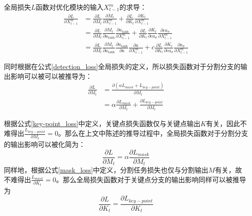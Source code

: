 \begin{corollary}
\label{corollary:loss2xm}
全局损失$L$函数对优化模块的输入$X^m_{t-1}$的求导：
\begin{equation*}
\begin{aligned}
\frac{\partial L}{\partial X^m_{t-1}} &= \frac{\partial L}{\partial M_t}\frac{\partial M_t}{\partial X^m_{t-1}} + \frac{\partial L}{\partial K_t}\frac{\partial K_t}{\partial X^m_{t-1}}\\
&=\frac{\partial L}{\partial M_t}\frac{\partial M_t}{\partial a_{\tanh}}\frac{\partial a_{\tanh}}{\partial X^m_{t-1}} + \frac{\partial L}{\partial K_t}\frac{\partial K_t}{\partial ca_{\sigma}}\frac{\partial ca_{\sigma}}{\partial X^m_{t-1}}\\
&=\frac{\partial L}{\partial M_t}\frac{\partial M_t}{\partial a_{\tanh}}\frac{\partial a_{\tanh}}{\partial a}\frac{\partial a}{\partial X^m_{t-1}} + c\frac{\partial L}{\partial K_t}\frac{\partial K_t}{\partial ca_{\sigma}}\frac{\partial a_{\sigma}}{\partial X^m_{t-1}}
\end{aligned}
\end{equation*}
\end{corollary}

同时根据在公式\eqref{detection_loss}全局损失的定义，所以损失函数对于分割分支的输出影响可以被可以被推导为：
\begin{equation*}
\begin{aligned}
\frac{\partial L}{\partial M_t} &= \frac{\partial (\alpha L_{mask} + L_{key-point})}{\partial M_t}\\
&= \alpha\frac{\partial L_{mask}}{\partial M_t} + \frac{\partial L_{key-point}}{\partial M_t}
\end{aligned}
\end{equation*}

根据公式\eqref{key-point_loss}中定义，关键点损失函数仅与关键点输出$K$有关，因此不难得出$\frac{L_{key-point}}{\partial M_t}=0$。那么在上文中陈述的推导过程中，全局损失函数对于分割分支的输出影响可以被化简为：
\begin{equation}
\label{eq:L2Mt}
\frac{\partial L}{\partial M_t} = \alpha\frac{\partial L_{mask}}{\partial M_t}
\end{equation}
同样地，根据公式\eqref{mask_loss}中定义，分割任务损失也仅与分割输出$M$有关，故不难得出$\frac{L_{mask}}{\partial K_t}=0$。那么全局损失函数对于关键点分支的输出影响同样可以被推导为
\begin{equation}
\label{eq:L2Kt}
\frac{\partial L}{\partial K_t} = \frac{\partial L_{key-point}}{\partial K_t}
\end{equation}

